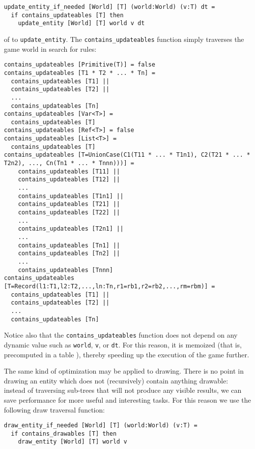 \begin{lstlisting}
update_entity_if_needed [World] [T] (world:World) (v:T) dt =
  if contains_updateables [T] then 
    update_entity [World] [T] world v dt
\end{lstlisting}

 of to \texttt{update\_entity}. The \texttt{contains\_updateables} function simply traverses the game world in search for rules:

\begin{lstlisting}
contains_updateables [Primitive(T)] = false
contains_updateables [T1 * T2 * ... * Tn] =
  contains_updateables [T1] ||
  contains_updateables [T2] ||
  ...
  contains_updateables [Tn]
contains_updateables [Var<T>] = 
  contains_updateables [T]
contains_updateables [Ref<T>] = false
contains_updateables [List<T>] =
  contains_updateables [T]
contains_updateables [T=UnionCase(C1(T11 * ... * T1n1), C2(T21 * ... * T2n2), ..., Cn(Tn1 * ... * Tnnn)))] =
    contains_updateables [T11] ||
    contains_updateables [T12] ||
    ...
    contains_updateables [T1n1] ||
    contains_updateables [T21] ||
    contains_updateables [T22] ||
    ...
    contains_updateables [T2n1] ||
    ...
    contains_updateables [Tn1] ||
    contains_updateables [Tn2] ||
    ...
    contains_updateables [Tnnn]
contains_updateables [T=Record(l1:T1,l2:T2,...,ln:Tn,r1=rb1,r2=rb2,...,rm=rbm)] =
  contains_updateables [T1] ||
  contains_updateables [T2] ||
  ...
  contains_updateables [Tn]
\end{lstlisting}

Notice also that the \texttt{contains\_updateables} function does not depend on any dynamic value such as \texttt{world}, \texttt{v}, or \texttt{dt}. For this reason, it is memoized (that is, precomputed in a table \cite{CHAPTER_6_MEMOIZATION}), thereby speeding up the execution of the game further.

The same kind of optimization may be applied to drawing. There is no point in drawing an entity which does not (recursively) contain anything drawable: instead of traversing sub-trees that will not produce any visible results, we can save performance for more useful and interesting tasks. For this reason we use the following draw traversal function:

\begin{lstlisting}
draw_entity_if_needed [World] [T] (world:World) (v:T) =
  if contains_drawables [T] then 
    draw_entity [World] [T] world v
\end{lstlisting}

